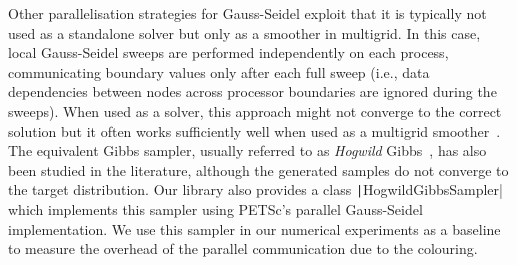 \documentclass[
fontsize=11pt,
paper=a4,
numbers=noenddot
]{scrartcl}
\begin{document}
Other parallelisation strategies for Gauss-Seidel exploit that it is typically not used as a standalone solver but only as a smoother in multigrid. In this case, local Gauss-Seidel sweeps are performed independently on each process, communicating boundary values only after each full sweep (i.e., data dependencies between nodes across processor boundaries are ignored during the sweeps). When used as a solver, this approach might not converge to the correct solution but it often works sufficiently well when used as a multigrid smoother~\cite{parmultigrid}. The equivalent Gibbs sampler, usually referred to as \emph{Hogwild} Gibbs~\cite{hogwild}, has also been studied in the literature, although the generated samples do not converge to the target distribution. Our library also provides a class \texttt|HogwildGibbsSampler| which implements this sampler using PETSc's parallel Gauss-Seidel implementation. We use this sampler in our numerical experiments as a baseline to measure the overhead of the parallel communication due to the colouring.


\end{document}
